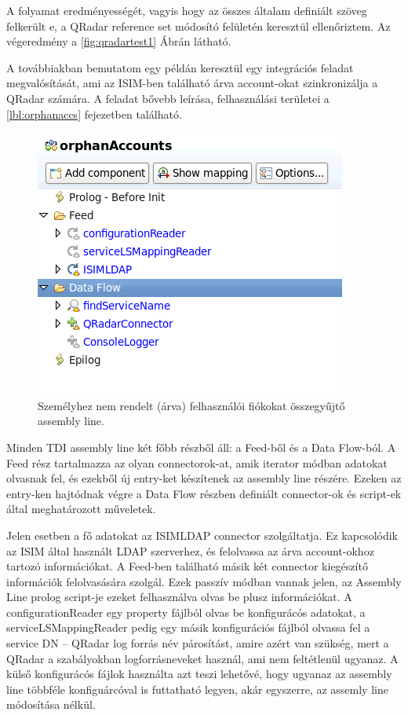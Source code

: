 A folyamat eredményességét, vagyis hogy az összes általam definiált szöveg felkerült e, a QRadar reference set módosító felületén keresztül ellenőriztem. Az végeredmény a \ref{fig:qradartest1} Ábrán látható. 
 
A továbbiakban bemutatom egy példán keresztül egy integrációs feladat megvalósítását, ami az ISIM-ben található árva account-okat szinkronizálja a QRadar számára. A feladat bővebb leírása, felhasználási területei a \ref{lbl:orphanaccs} fejezetben található. 

\begin{figure}[h]
	\centering
	\includegraphics[width=0.6\linewidth]{figures/conn_test/queryAssemblyLineSmall}
	\caption{Személyhez nem rendelt (árva) felhasználói fiókokat összegyűjtő assembly line.}
	\label{fig:queryassemblyline}
\end{figure}

Minden TDI assembly line két főbb részből áll: a Feed-ből és a Data Flow-ból. A Feed rész tartalmazza az olyan connectorok-at, amik iterator módban adatokat olvasnak fel, és ezekből új entry-ket készítenek az assembly line részére. Ezeken az entry-ken hajtódnak végre a Data Flow részben definiált connector-ok és script-ek által meghatározott műveletek.

Jelen esetben a fő adatokat az ISIMLDAP connector szolgáltatja. Ez kapcsolódik az ISIM által használt LDAP szerverhez, és felolvassa az árva account-okhoz tartozó információkat. A Feed-ben található másik két connector kiegészítő információk felolvasására szolgál. Ezek passzív módban vannak jelen, az Assembly Line prolog script-je ezeket felhasználva olvas be plusz információkat. A configurationReader egy property fájlból olvas be konfigurácós adatokat, a serviceLSMappingReader pedig egy másik konfigurációs fájlból olvassa fel a service DN -- QRadar log forrás név párosítást, amire azért van szükség, mert a QRadar a szabályokban logforrásneveket használ, ami nem feltétlenül ugyanaz. A külső konfigurácós fájlok használta azt teszi lehetővé, hogy ugyanaz az assembly line többféle konfiguárcóval is futtatható legyen, akár egyszerre, az assemly line módosítása nélkül.

